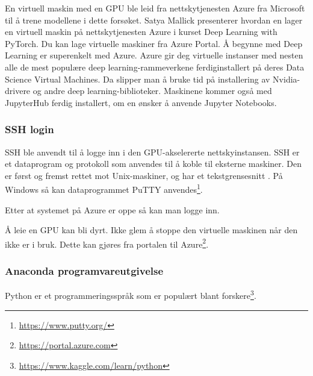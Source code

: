 En virtuell maskin med en GPU ble leid fra nettskytjenesten Azure fra Microsoft til å trene modellene i dette forsøket. Satya Mallick presenterer hvordan en lager en virtuell maskin på nettskytjenesten Azure i kurset Deep Learning with PyTorch. Du kan lage virtuelle maskiner fra Azure Portal. Å begynne med Deep Learning er superenkelt med Azure. Azure gir deg virtuelle instanser med nesten alle de mest populære deep learning-rammeverkene ferdiginstallert på deres Data Science Virtual Machines. Da slipper man å bruke tid på installering av Nvidia-drivere og andre deep learning-biblioteker. Maskinene kommer også med JupyterHub ferdig installert, om en ønsker å anvende Jupyter Notebooks. \cite{Mallick m.fl. 2020}


\subsubsection{SSH login}

SSH ble anvendt til å logge inn i den GPU-akselererte nettskyinstansen. SSH er et dataprogram og protokoll som anvendes til å koble til eksterne maskiner. Den er først og fremst rettet mot Unix-maskiner, og har et tekstgrensesnitt \cite{Mallick m.fl. 2020}. På Windows så kan dataprogrammet PuTTY anvendes\footnote{\url{https://www.putty.org/}}.

Etter at systemet på Azure er oppe så kan man logge inn.%

Å leie en GPU kan bli dyrt. Ikke glem å stoppe den virtuelle maskinen når den ikke er i bruk. Dette kan gjøres fra portalen til Azure\footnote{\url{https://portal.azure.com}}.


\subsubsection{Anaconda programvareutgivelse}

Python er et programmeringsspråk som er populært blant forskere\footnote{\url{https://www.kaggle.com/learn/python}}. \cite{Morris 2020}

